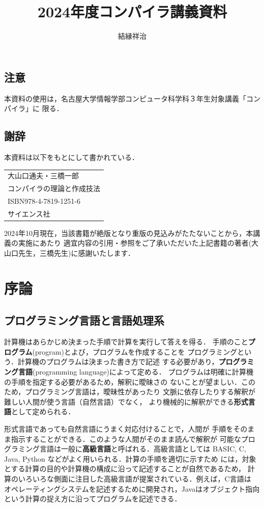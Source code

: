\documentclass[dvipdfmx,a4j]{jbook}
\title{2024年度コンパイラ講義資料}
\author{結縁祥治}
\date{}
\begin{document}
\maketitle

\section*{注意}
本資料の使用は，名古屋大学情報学部コンピュータ科学科３年生対象講義「コンパイラ」に
限る．

\section*{謝辞}

本資料は以下をもとにして書かれている．

\begin{center}
\begin{tabular}{l}
大山口通夫・三橋一郎\\
コンパイラの理論と作成技法\\
ISBN978-4-7819-1251-6\\
サイエンス社
\end{tabular}
\end{center}

2024年10月現在，当該書籍が絶版となり重版の見込みがたたないことから，本講義の実施にあたり
適宜内容の引用・参照をご了承いただいた上記書籍の著者(大山口先生，三橋先生)に感謝いたします．

\chapter{序論}
\section{プログラミング言語と言語処理系}
計算機はあらかじめ決まった手順で計算を実行して答えを得る．
手順のこと{\bf プログラム}(program)とよび，プログラムを作成することを
プログラミングという．計算機のプログラムは決まった書き方で記述
する必要があり，{\bf プログラミング言語}(programming language)によって定める．
プログラムは明確に計算機の手順を指定する必要があるため，解釈に曖昧さの
ないことが望ましい．このため，プログラミング言語は，曖昧性があったり
文脈に依存したりする解釈が難しい人間が使う言語（自然言語）でなく，
より機械的に解釈ができる{\bf 形式言語}として定められる．

形式言語であっても自然言語にうまく対応付けることで，人間が
手順をそのまま指示することができる．このような人間がそのまま読んで解釈が
可能なプログラミング言語は一般に{\bf 高級言語}と呼ばれる．高級言語としては
BASIC, C, Java, Python などがよく用いられる．計算の手順を適切に示すため
には，対象とする計算の目的や計算機の構成に沿って記述することが自然であるため，
計算のいろいろな側面に注目した高級言語が提案されている．例えば，C言語は
オペレーティングシステムを記述するために開発され，Javaはオブジェクト指向
という計算の捉え方に沿ってプログラムを記述できる．
\end{document}
